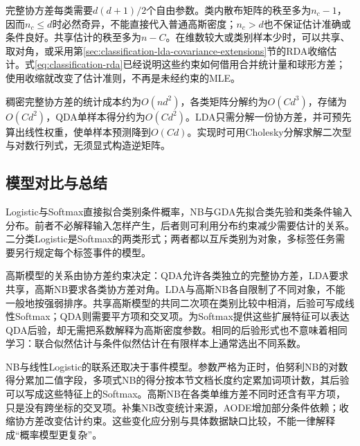 完整协方差每类需要$d(d+1)/2$个自由参数。类内散布矩阵的秩至多为$n_c-1$，因而$n_c\leq d$时必然奇异，不能直接代入普通高斯密度；$n_c>d$也不保证估计准确或条件良好。共享估计的秩至多为$n-C$。在维数较大或类别样本少时，可以共享、取对角，或采用第\ref{sec:classification-lda-covariance-extensions}节的RDA收缩估计。式\eqref{eq:classification-rda}已经说明这些约束如何借用合并统计量和球形方差；使用收缩就改变了估计准则，不再是未经约束的MLE。

稠密完整协方差的统计成本约为$O(nd^2)$，各类矩阵分解约为$O(Cd^3)$，存储为$O(Cd^2)$，QDA单样本得分约为$O(Cd^2)$。LDA只需分解一份协方差，并可预先算出线性权重，使单样本预测降到$O(Cd)$。实现时可用Cholesky分解求解二次型与对数行列式，无须显式构造逆矩阵。

\subsection{模型对比与总结}
\label{sec:classification-probability-comparison}

Logistic与Softmax直接拟合类别条件概率，NB与GDA先拟合类先验和类条件输入分布。前者不必解释输入怎样产生，后者则可利用分布约束减少需要估计的关系。二分类Logistic是Softmax的两类形式；两者都以互斥类别为对象，多标签任务需要另行规定每个标签事件的模型。

高斯模型的关系由协方差约束决定：QDA允许各类独立的完整协方差，LDA要求共享，高斯NB要求各类协方差对角。LDA与高斯NB各自限制了不同对象，不能一般地按强弱排序。共享高斯模型的共同二次项在类别比较中相消，后验可写成线性Softmax；QDA则需要平方项和交叉项。为Softmax提供这些扩展特征可以表达QDA后验，却无需把系数解释为高斯密度参数。相同的后验形式也不意味着相同学习：联合似然估计与条件似然估计在有限样本上通常选出不同系数。

NB与线性Logistic的联系还取决于事件模型。参数严格为正时，伯努利NB的对数得分累加二值字段，多项式NB的得分按本节文档长度约定累加词项计数，其后验可以写成这些特征上的Softmax。高斯NB在各类单维方差不同时还含有平方项，只是没有跨坐标的交叉项。补集NB改变统计来源，AODE增加部分条件依赖；收缩协方差改变估计约束。这些变化应分别与具体数据缺口比较，不能一律解释成“概率模型更复杂”。

